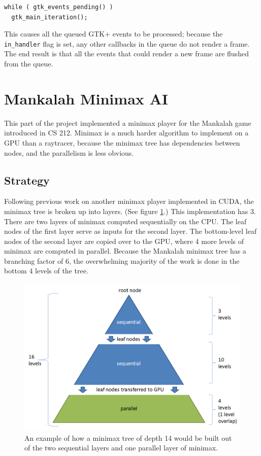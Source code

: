 \documentclass{article}
\begin{document}
\begin{lstlisting}
while ( gtk_events_pending() )
  gtk_main_iteration();
\end{lstlisting}

This causes all the queued GTK+ events to be processed; because the \texttt{in\_handler} flag is set, any other callbacks in the queue do not render a frame. The end result is that all the events that could render a new frame are flushed from the queue.

\section{Mankalah Minimax AI}
This part of the project implemented a minimax player for the Mankalah game introduced in CS 212. Minimax is a much harder algorithm to implement on a GPU than a raytracer, because the minimax tree has dependencies between nodes, and the parallelism is less obvious.

\subsection{Strategy}
Following previous work on another minimax player implemented in CUDA\cite{rockisuda10}, the minimax tree is broken up into layers. (See figure \ref{fig:mankalahdepths}.) This implementation has 3. There are two layers of minimax computed sequentially on the CPU. The leaf nodes of the first layer serve as inputs for the second layer. The bottom-level leaf nodes of the second layer are copied over to the GPU, where 4 more levels of minimax are computed in parallel. Because the Mankalah minimax tree has a branching factor of 6, the overwhelming majority of the work is done in the bottom 4 levels of the tree.

\begin{figure}[ht!]
\centering
\includegraphics[width=150mm]{mankalah-depths.png}
\caption{An example of how a minimax tree of depth 14 would be built out of the two sequential layers and one parallel layer of minimax.}
\label{fig:mankalahdepths}
\end{figure}
\end{document}
